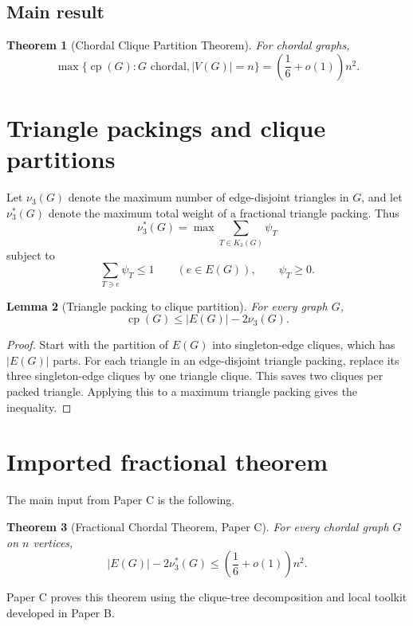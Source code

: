 \documentclass[11pt]{article}
\newtheorem{theorem}{Theorem}[section]
\newtheorem{lemma}[theorem]{Lemma}
\theoremstyle{definition}
\newcommand{\cp}{\operatorname{cp}}
\begin{document}
\subsection*{Main result}

\begin{theorem}[Chordal Clique Partition Theorem]\label{thm:main}
For chordal graphs,
\[
    \max\{\cp(G):G\text{ chordal}, |V(G)|=n\}
    =
    \left(\frac16+o(1)\right)n^2.
\]
\end{theorem}

\section{Triangle packings and clique partitions}

Let \(\nu_3(G)\) denote the maximum number of edge-disjoint triangles in \(G\), and let \(\nu_3^*(G)\) denote the maximum total weight of a fractional triangle packing. Thus
\[
    \nu_3^*(G)=
    \max\sum_{T\in K_3(G)}\psi_T
\]
subject to
\[
    \sum_{T\ni e}\psi_T\le1
    \qquad(e\in E(G)),
    \qquad
    \psi_T\ge0.
\]

\begin{lemma}[Triangle packing to clique partition]\label{lem:packing-to-cp}
For every graph \(G\),
\[
    \cp(G)\le |E(G)|-2\nu_3(G).
\]
\end{lemma}

\begin{proof}
Start with the partition of \(E(G)\) into singleton-edge cliques, which has \(|E(G)|\) parts. For each triangle in an edge-disjoint triangle packing, replace its three singleton-edge cliques by one triangle clique. This saves two cliques per packed triangle. Applying this to a maximum triangle packing gives the inequality.
\end{proof}

\section{Imported fractional theorem}

The main input from Paper C is the following.

\begin{theorem}[Fractional Chordal Theorem, Paper C]\label{thm:fractional}
For every chordal graph \(G\) on \(n\) vertices,
\[
    |E(G)|-2\nu_3^*(G)
    \le
    \left(\frac16+o(1)\right)n^2.
\]
\end{theorem}

Paper C proves this theorem using the clique-tree decomposition and local toolkit developed in Paper B.
\end{document}
